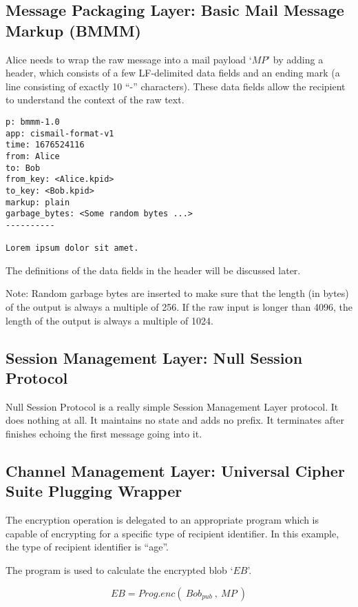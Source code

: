 \documentclass[a4paper,11pt]{article}
\begin{document}
\subsection{Message Packaging Layer: Basic Mail Message Markup (BMMM)}

Alice needs to wrap the raw message into a mail payload `$MP$' by adding a header,
which consists of a few LF-delimited data fields and an ending mark (a line consisting of exactly 10 ``-'' characters).
These data fields allow the recipient to understand the context of the raw text.

\begin{lstlisting}
p: bmmm-1.0
app: cismail-format-v1
time: 1676524116
from: Alice
to: Bob
from_key: <Alice.kpid>
to_key: <Bob.kpid>
markup: plain
garbage_bytes: <Some random bytes ...>
----------

Lorem ipsum dolor sit amet.
\end{lstlisting}

The definitions of the data fields in the header will be discussed later.

Note: Random garbage bytes are inserted to make sure that the length (in bytes) of the output is always a multiple of 256.
If the raw input is longer than 4096, the length of the output is always a multiple of 1024.

\subsection{Session Management Layer: Null Session Protocol}

Null Session Protocol is a really simple Session Management Layer protocol.
It does nothing at all.
It maintains no state and adds no prefix.
It terminates after finishes echoing the first message going into it.

\subsection{Channel Management Layer: Universal Cipher Suite Plugging Wrapper}

The encryption operation is delegated to an appropriate program
which is capable of encrypting for a specific type of recipient identifier.
In this example, the type of recipient identifier is ``age''.

The program is used to calculate the encrypted blob `$EB$'.

\begin{displaymath}
	EB = Prog.enc(~Bob_{pub}~,~MP~)
\end{displaymath}
\end{document}
